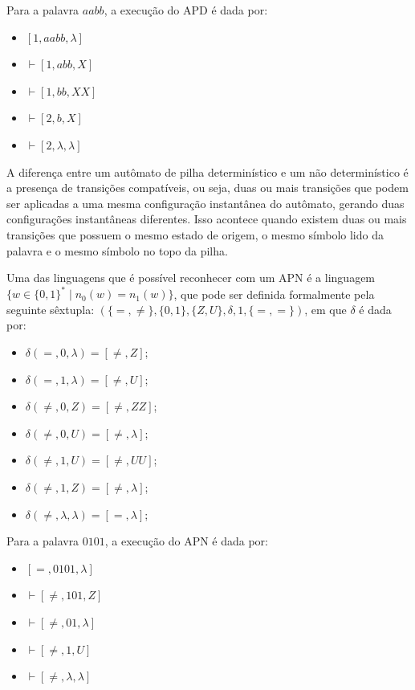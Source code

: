 Para a palavra $aabb$, a execução do APD é dada por:

\begin{itemize}
    \item[] $[1, aabb, \lambda]$
    \item[] $\vdash [1, abb, X]$
    \item[] $\vdash [1, bb, XX]$
    \item[] $\vdash [2, b, X]$
    \item[] $\vdash [2, \lambda, \lambda]$
\end{itemize}


A diferença entre um autômato de pilha determinístico e um não determinístico é a presença de transições compatíveis, ou seja, duas ou mais transições que podem ser aplicadas a uma mesma configuração instantânea do autômato, gerando duas configurações instantâneas diferentes. Isso acontece quando existem duas ou mais transições que possuem o mesmo estado de origem, o mesmo símbolo lido da palavra e o mesmo símbolo no topo da pilha.

Uma das linguagens que é possível reconhecer com um APN é a linguagem $\{w \in \{0,1\}^* \mid n_0(w) = n_1(w)\}$, que pode ser definida formalmente pela seguinte sêxtupla: $(\{=,\neq\},\{0,1\},\{Z,U\},\delta,1,\{=,=\})$, em que $\delta$ é dada por:

\begin{itemize}
    \item[] $\delta(=, 0, \lambda) = [\neq, Z]$;
    \item[] $\delta(=, 1, \lambda) = [\neq, U]$;
    \item[] $\delta(\neq, 0, Z) = [\neq, ZZ]$;
    \item[] $\delta(\neq, 0, U) = [\neq, \lambda]$;
    \item[] $\delta(\neq, 1, U) = [\neq, UU]$;
    \item[] $\delta(\neq, 1, Z) = [\neq, \lambda]$;
    \item[] $\delta(\neq, \lambda, \lambda) = [=, \lambda]$;
\end{itemize}

Para a palavra $0101$, a execução do APN é dada por:

\begin{itemize}
    \item[] $[=, 0101, \lambda]$
    \item[] $\vdash [\neq, 101, Z]$
    \item[] $\vdash [\neq, 01, \lambda]$
    \item[] $\vdash [\neq, 1, U]$
    \item[] $\vdash [\neq, \lambda, \lambda]$
\end{itemize}

